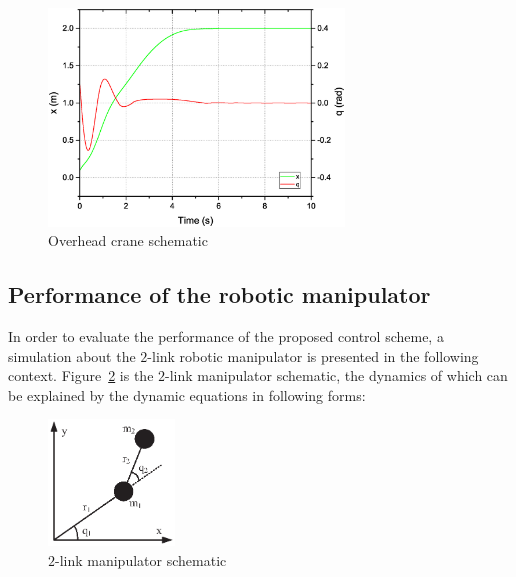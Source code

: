 \documentclass[3p]{elsarticle}
\theoremstyle{plain}
\theoremstyle{remark}
\begin{document}
\begin{figure}
\centering
\includegraphics[width=0.7\textwidth]{paper3_fig9.eps}
\caption{Overhead crane schematic}
\label{Figure:9}
\end{figure}
\subsection{Performance of the robotic manipulator}\label{sec:robotica manipulator}
In order to evaluate the performance of the proposed control scheme, a simulation about the $2$-link robotic manipulator is presented in the following context. Figure~\ref{Figure:1} is the $2$-link manipulator schematic, the dynamics of which can be explained by the dynamic equations in following forms:
\begin{figure}
\centering
\includegraphics[width=0.3\textwidth]{paper3_fig1.eps}
\caption{$2$-link manipulator schematic}
\label{Figure:1}
\end{figure}
\end{document}
